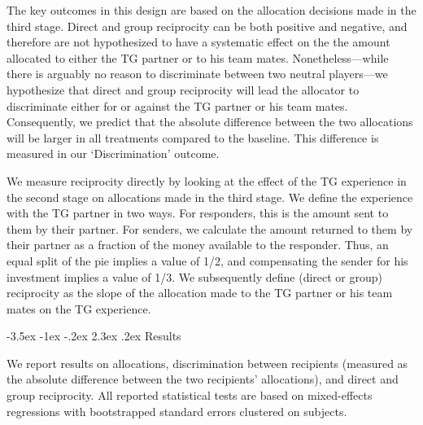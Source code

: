 \documentclass[12pt,a4paper]{article}\usepackage[]{graphicx}\usepackage[]{color}
\makeatletter
\renewcommand\section{\@startsection {section}{1}{\z@}%
{-3.5ex \@plus -1ex \@minus -.2ex}%
{2.3ex \@plus.2ex}%
{\bf\sffamily\Large}}
\makeatother
\begin{document}
The key outcomes in this design are based on the allocation decisions made in the third stage. Direct and group reciprocity can be both positive and negative, and therefore are not hypothesized to have a systematic effect on the the amount allocated to either the TG partner or to his team mates. Nonetheless---while there is arguably no reason to discriminate between two neutral players---we hypothesize that direct and group reciprocity will lead the allocator to discriminate either for or against the TG partner or his team mates. Consequently, we predict that the absolute difference between the two allocations will be larger in all treatments compared to the baseline. This difference is measured in our `Discrimination' outcome.

We measure reciprocity directly by looking at the effect of the TG experience in the second stage on allocations made in the third stage. We define the experience with the TG partner in two ways. For responders, this is the amount sent to them by their partner. For senders, we calculate the amount returned to them by their partner as a fraction of the money available to the responder. Thus, an equal split of the pie implies a value of 1/2, and compensating the sender for his investment implies a value of 1/3. We subsequently define (direct or group) reciprocity as the slope of the allocation made to the TG partner or his team mates on the TG experience.

\section{Results}
\label{sec:results}

We report results on allocations, discrimination between recipients (measured as the
absolute difference between the two recipients' allocations), and direct and
group reciprocity. All reported statistical tests are based on mixed-effects
regressions with bootstrapped standard errors clustered on subjects. %
\end{document}
